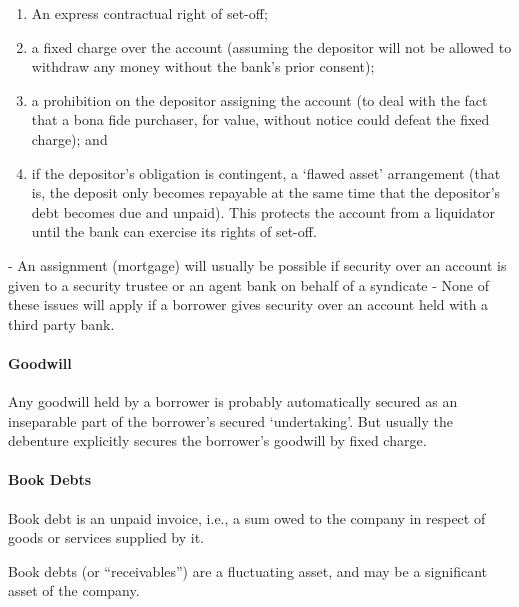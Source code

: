 \documentclass[
]{article}
\newenvironment{Shaded}{}{}
\newcommand{\NormalTok}[1]{#1}
\providecommand{\tightlist}{%
  \setlength{\itemsep}{0pt}\setlength{\parskip}{0pt}}
\begin{document}
\begin{enumerate}
\def\labelenumi{\arabic{enumi}.}
\tightlist
\item
  An express contractual right of set-off;
\item
  a fixed charge over the account (assuming the depositor will not be
  allowed to withdraw any money without the bank's prior consent);
\item
  a prohibition on the depositor assigning the account (to deal with the
  fact that a bona fide purchaser, for value, without notice could
  defeat the fixed charge); and
\item
  if the depositor's obligation is contingent, a `flawed asset'
  arrangement (that is, the deposit only becomes repayable at the same
  time that the depositor's debt becomes due and unpaid). This protects
  the account from a liquidator until the bank can exercise its rights
  of set-off.
\end{enumerate}

\begin{Shaded}
\begin{Highlighting}[]
\NormalTok{{-} An assignment (mortgage) will usually be possible if security over an account is given to a security trustee or an agent bank on behalf of a syndicate}
\NormalTok{{-} None of these issues will apply if a borrower gives security over an account held with a third party bank.}
\end{Highlighting}
\end{Shaded}

\hypertarget{goodwill}{%
\paragraph{Goodwill}\label{goodwill}}

Any goodwill held by a borrower is probably automatically secured as an
inseparable part of the borrower's secured `undertaking'. But usually
the debenture explicitly secures the borrower's goodwill by fixed
charge.

\hypertarget{book-debts}{%
\paragraph{Book Debts}\label{book-debts}}

Book debt is an unpaid invoice, i.e., a sum owed to the company in
respect of goods or services supplied by it.

Book debts (or ``receivables'') are a fluctuating asset, and may be a
significant asset of the company.
\end{document}
